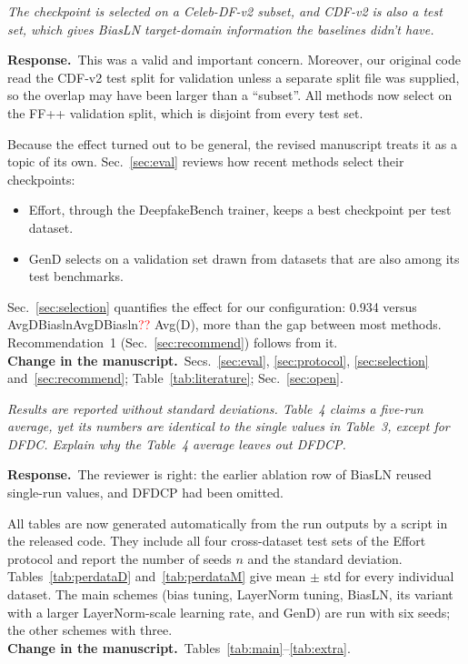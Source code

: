 \documentclass[11pt]{article}
\newcommand{\num}[1]{\ifcsname #1\endcsname\csname #1\endcsname\else\textcolor{red}{??}\fi}
\newenvironment{comment}{\par\medskip\noindent\begin{minipage}{\linewidth}\color{black!70}\itshape}{\end{minipage}\par\smallskip}
\newcommand{\resp}{\noindent\textbf{Response.}~}
\newcommand{\change}{\noindent\textbf{Change in the manuscript.}~}
\begin{document}
\begin{comment}
The checkpoint is selected on a Celeb-DF-v2 subset, and CDF-v2 is also a test set, which gives BiasLN target-domain information the baselines didn't have.
\end{comment}
\resp This was a valid and important concern. Moreover, our original code read the CDF-v2 test split for validation unless a separate split file was supplied, so the overlap may have been larger than a ``subset''. All methods now select on the FF++ validation split, which is disjoint from every test set.

Because the effect turned out to be general, the revised manuscript treats it as a topic of its own. Sec.~\ref{sec:eval} reviews how recent methods select their checkpoints:
\begin{itemize}
\item Effort, through the DeepfakeBench trainer, keeps a best checkpoint per test dataset.
\item GenD selects on a validation set drawn from datasets that are also among its test benchmarks.
\end{itemize}
Sec.~\ref{sec:selection} quantifies the effect for our configuration: 0.934 versus \num{AvgDBiasln} Avg(D), more than the gap between most methods. Recommendation~1 (Sec.~\ref{sec:recommend}) follows from it.\\
\change Secs.~\ref{sec:eval}, \ref{sec:protocol}, \ref{sec:selection} and~\ref{sec:recommend}; Table~\ref{tab:literature}; Sec.~\ref{sec:open}.

\begin{comment}
Results are reported without standard deviations. Table~4 claims a five-run average, yet its numbers are identical to the single values in Table~3, except for DFDC. Explain why the Table~4 average leaves out DFDCP.
\end{comment}
\resp The reviewer is right: the earlier ablation row of BiasLN reused single-run values, and DFDCP had been omitted.

All tables are now generated automatically from the run outputs by a script in the released code. They include all four cross-dataset test sets of the Effort protocol and report the number of seeds $n$ and the standard deviation. Tables~\ref{tab:perdataD} and~\ref{tab:perdataM} give mean $\pm$ std for every individual dataset. The main schemes (bias tuning, LayerNorm tuning, BiasLN, its variant with a larger LayerNorm-scale learning rate, and GenD) are run with six seeds; the other schemes with three.\\
\change Tables~\ref{tab:main}--\ref{tab:extra}.
\end{document}
